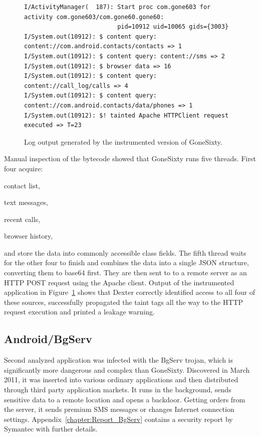 \documentclass[12pt,twoside,notitlepage]{report}
\begin{document}
\begin{figure}[t]
	\scriptsize
	\begin{verbatim}
I/ActivityManager(  187): Start proc com.gone603 for activity com.gone603/com.gone60.gone60: 
                          pid=10912 uid=10065 gids={3003}
I/System.out(10912): $ content query: content://com.android.contacts/contacts => 1
I/System.out(10912): $ content query: content://sms => 2
I/System.out(10912): $ browser data => 16
I/System.out(10912): $ content query: content://call_log/calls => 4
I/System.out(10912): $ content query: content://com.android.contacts/data/phones => 1
I/System.out(10912): $! tainted Apache HTTPClient request executed => T=23
	\end{verbatim}
	\caption{Log output generated by the instrumented version of GoneSixty.}
	\label{figure:Evaluation_GoneSixty}
\end{figure}

Manual inspection of the bytecode showed that GoneSixty runs five threads. First four acquire:
\begin{inparaenum}[(i)]
\item contact list,
\item text messages,
\item recent calls,
\item browser history,
\end{inparaenum}
and store the data into commonly accessible class fields. The fifth thread waits for the other four to finish and combines the data into a single JSON structure, converting them to base64 first. They are then sent to to a remote server as an HTTP POST request using the Apache client. Output of the instrumented application in Figure~\ref{figure:Evaluation_GoneSixty} shows that Dexter correctly identified access to all four of these sources, successfully propagated the taint tags all the way to the HTTP request execution and printed a leakage warning. 

\subsection{Android/BgServ}

Second analyzed application was infected with the BgServ trojan, which is significantly more dangerous and complex than GoneSixty. Discovered in March 2011, it was inserted into various ordinary applications and then distributed through third party application markets. It runs in the background, sends sensitive data to a remote location and opens a backdoor. Getting orders from the server, it sends premium SMS messages or changes Internet connection settings. Appendix~\ref{chapter:Report_BgServ} contains a security report by Symantec with further details. 
\end{document}
